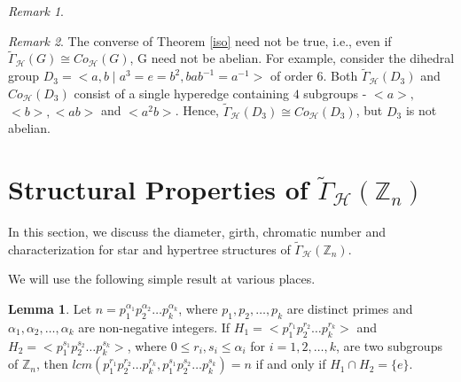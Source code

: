 \documentclass[11pt,a4paper]{article}
\theoremstyle{definition}
\newtheorem{lemma}[theorem]{Lemma}
\theoremstyle{remark}
\newtheorem{remark}{Remark}[section]
\begin{document}
\begin{remark}
\begin{figure}[h]
{}
			\caption{}
			\label{D4}
		\end{figure}		
	\end{remark}
	\begin{remark}
		The converse of Theorem \ref{iso} need not be true, i.e., even if $\tilde{\Gamma}_{\mathcal{H}}(G) \cong Co_\mathcal{H}(G)$, G need not be abelian. For example, consider the dihedral group $D_3=<a,b \mid a^3=e=b^2, bab^{-1}=a^{-1}>$ of order 6. Both $\tilde{\Gamma}_{\mathcal{H}}(D_3)$ and $Co_\mathcal{H}(D_3)$ consist of a single hyperedge containing $4$ subgroups - $<a>,$ $<b>,<ab>$ and $<a^2b>$. Hence, $\tilde{\Gamma}_{\mathcal{H}}(D_3) \cong Co_\mathcal{H}(D_3)$, but $D_3$ is not abelian.
	\end{remark}
	\section{Structural Properties of $\tilde{\Gamma}_\mathcal{H}(\mathbb{Z}_n)$}
In this section, we discuss the diameter, girth, chromatic number and characterization for star and hypertree structures of $\tilde{\Gamma}_\mathcal{H}(\mathbb{Z}_n)$.

\noindent We will use the following simple result at various places.
	\begin{lemma}\label{lemma2}
	Let $n=p_1^{\alpha_1}p_2^{\alpha_2}\ldots p_k^{\alpha_k}$, where $p_1,p_2, \ldots,p_k$ are distinct primes and $\alpha_1,\alpha_2,\ldots,\alpha_k$ are non-negative integers.	If $H_1=<p_1^{r_1}p_2^{r_2}\ldots p_k^{r_k}>$ and $H_2=<p_1^{s_1}p_2^{s_2}\ldots p_k^{s_k}>$, where $0 \leq r_i,s_i \leq \alpha_i$ for $i=1,2, \ldots, k$, are two subgroups of  $\mathbb{Z}_n$, then   $lcm(p_1^{r_1}p_2^{r_2}\ldots p_k^{r_k},p_1^{s_1}p_2^{s_2}\ldots p_k^{s_k})=n$ if and only if $H_1 \cap H_2 =\{e\}$.
	\end{lemma}
\end{document}
